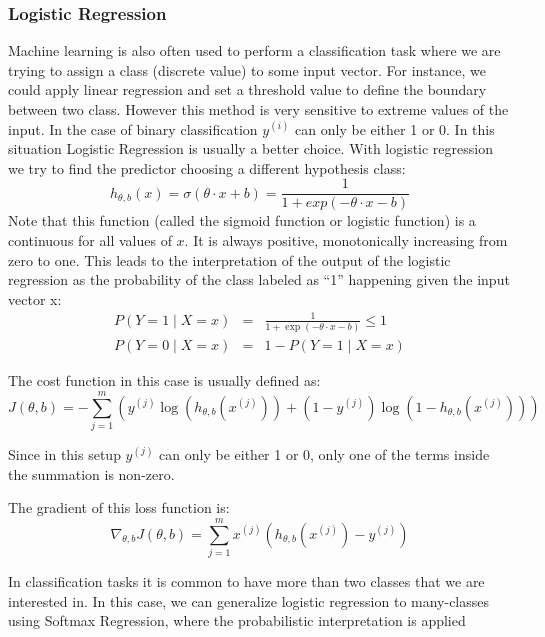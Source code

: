 \subsubsection{Logistic Regression}
\label{subsubsec:Logistic-Regression}
Machine learning is also often used to perform a classification task where we are trying to assign a class (discrete value) to some input vector. For instance, we could apply linear regression and set a  threshold value to define the boundary between two class. However this method is very sensitive to extreme values of the input. In the case of binary classification $y^{(i)}$ can only be either 1 or 0. In this situation Logistic Regression is usually a better choice. With logistic regression we try to find the predictor choosing a different hypothesis class: 
\begin{equation}
h_{ \theta, b } (x) = \sigma ( \theta \cdot x + b) = \frac{1}{ 1 + exp(-\theta \cdot x - b) }
\label{def:logistic-regression}
\end{equation}
Note that this function (called the sigmoid function or logistic function) is a continuous for all values of $x$. It is always positive, monotonically increasing from zero to one. This leads to the interpretation of the output of the logistic regression as the probability of the class labeled as “1” happening given the input vector x: 
\begin{eqnarray}
P( Y=1 \mid  X = x ) &=& \frac{1}{ 1 + \exp(-\theta \cdot x - b)} \leqslant 1 \\
P( Y=0 \mid  X = x ) &=& 1 - P( Y=1 \mid  X = x )
\end{eqnarray}

The cost function in this case is usually defined as:
\begin{equation}
J(\theta,b) = - \sum _{j= 1}^m ( y^{(j)} \log(h_{\theta,b}(x^{(j)})) + (1-y^{(j)}) \log(1- h_{\theta,b}(x^{(j)})) )
\end{equation}

Since in this setup $y^{(j)}$ can only be either 1 or 0, only one of the terms inside the summation is non-zero.

The gradient of this loss function is:
\begin{equation}
\nabla _{\theta,b} J(\theta,b) = \sum _{j= 1}^m x^{(j)} ( h_{\theta,b}(x^{(j)}) - y^{(j)} )
\end{equation}

In classification tasks it is common to have more than two classes that we are interested in. In this case, we can generalize logistic regression to many-classes using Softmax Regression, where the probabilistic interpretation is applied

